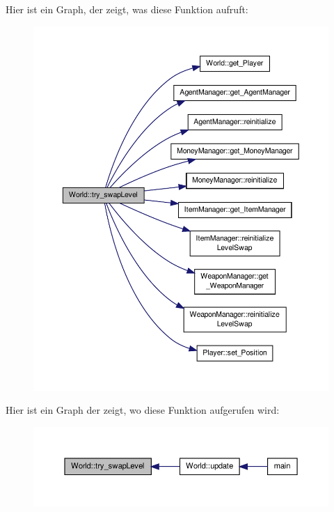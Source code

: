 Hier ist ein Graph, der zeigt, was diese Funktion aufruft\-:
\nopagebreak
\begin{figure}[H]
\begin{center}
\leavevmode
\includegraphics[width=350pt]{class_world_a227f2998664ae3586190752920ee2713_cgraph}
\end{center}
\end{figure}




Hier ist ein Graph der zeigt, wo diese Funktion aufgerufen wird\-:
\nopagebreak
\begin{figure}[H]
\begin{center}
\leavevmode
\includegraphics[width=350pt]{class_world_a227f2998664ae3586190752920ee2713_icgraph}
\end{center}
\end{figure}


